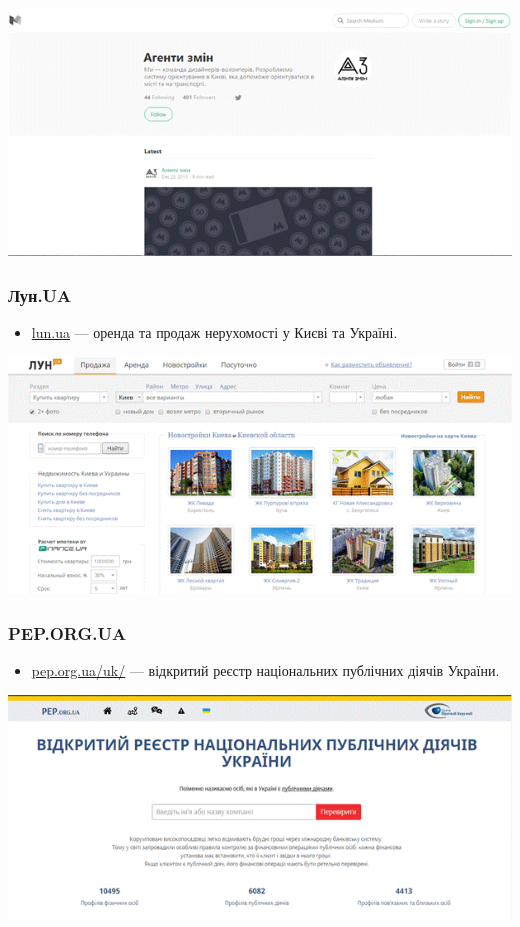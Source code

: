 \includegraphics{images/022.gif}

\subsubsection{Лун.UA}

\begin{itemize}
    \item \href{http://www.lun.ua/}{lun.ua} — оренда та продаж нерухомості у Києві та Україні.
\end{itemize}

\includegraphics{images/023.gif}

\subsubsection{PEP.ORG.UA}

\begin{itemize}
    \item \href{http://pep.org.ua/uk/}{pep.org.ua/uk/} — відкритий реєстр національних публічних діячів України.
\end{itemize}

\includegraphics{images/024.gif}

